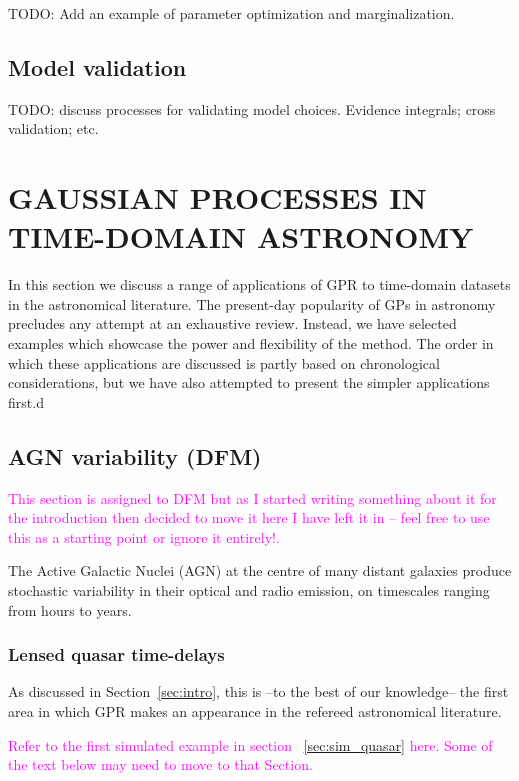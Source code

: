 \documentclass[letterpaper]{ar-1col}
\newcommand{\suz}[1]{\textcolor{magenta}{#1}}
\begin{document}
TODO: Add an example of parameter optimization and marginalization.

\subsection{Model validation}

TODO: discuss processes for validating model choices. Evidence integrals; cross validation; etc.


\section{GAUSSIAN PROCESSES IN TIME-DOMAIN ASTRONOMY}
\label{sec:uses}

In this section we discuss a range of applications of GPR to time-domain datasets in the astronomical literature. The present-day popularity of GPs in astronomy precludes any attempt at an exhaustive review. Instead, we have selected examples which showcase the power and flexibility of the method. The order in which these applications are discussed is partly based on chronological considerations, but we have also attempted to present the simpler applications first.d

\subsection{AGN variability (DFM)}

\suz{This section is assigned to DFM but as I started writing something about it for the introduction then decided to move it here I have left it in -- feel free to use this as a starting point or ignore it entirely!.}

The Active Galactic Nuclei (AGN) at the centre of many distant galaxies produce stochastic variability in their optical and radio emission, on timescales ranging from hours to years. 

\subsubsection{Lensed quasar time-delays}

As discussed in Section~\ref{sec:intro}, this is --to the best of our knowledge-- the first area in which GPR makes an appearance in the refereed astronomical literature. 

\suz{Refer to the first simulated example in section ~\ref{sec:sim_quasar} here. Some of the text below may need to move to that Section.}
\end{document}
